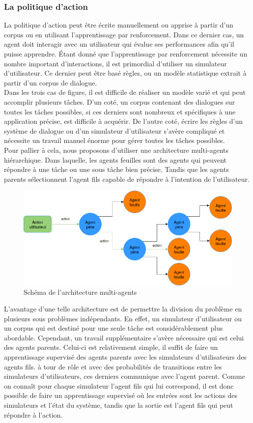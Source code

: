 \subsubsection{La politique d’action}
La politique d’action peut être écrite manuellement ou apprise à partir d’un corpus ou en utilisant l’apprentissage par renforcement. Dans ce dernier cas, un agent doit interagir avec un utilisateur qui évalue ses performances afin qu’il puisse apprendre. Étant donné que l’apprentissage par renforcement nécessite un nombre important d’interactions, il est primordial d’utiliser un simulateur d’utilisateur. Ce dernier peut être basé règles, ou un modèle statistique extrait à partir d’un corpus de dialogue.\\
Dans les trois cas de figure, il est difficile de réaliser un modèle varié et qui peut accomplir plusieurs tâches. D’un coté, un corpus contenant des dialogues sur toutes les tâches possibles, si ces derniers sont nombreux et spécifiques à une application précise, est difficile à acquérir. De l’autre coté, écrire les règles d’un système de dialogue ou d’un simulateur d’utilisateur s’avère compliqué et nécessite un travail manuel énorme pour gérer toutes les tâches possibles.\\
Pour pallier à cela, nous proposons d’utiliser une architecture multi-agents hiérarchique. Dans laquelle, les agents feuilles sont des agents qui peuvent répondre à une tâche ou une sous tâche bien précise. Tandis que les agents parents sélectionnent l’agent fils capable de répondre à l’intention de l’utilisateur.
\begin{figure}[H] 
	
	\centering
	\includegraphics[width=0.88\linewidth]{images/Conception/DM/multiagent.png}
	\caption{Schéma de l'architecture multi-agents}
\end{figure}\label{multiagent}
L’avantage d’une telle architecture est de permettre la division du problème en plusieurs sous problèmes indépendants. En effet, un simulateur d’utilisateur ou un corpus qui est destiné pour une seule tâche est considérablement plus abordable.  Cependant, un travail supplémentaire s’avère nécessaire qui est celui des agents parents. Celui-ci est relativement simple, il suffit de faire un apprentissage supervisé des agents parents avec les simulateurs d’utilisateurs des agents fils. à tour de rôle et avec des probabilités de transitions entre les simulateurs d’utilisateurs, ces derniers communique avec l’agent parent. Comme on connaît pour chaque simulateur l’agent fils qui lui correspond, il est donc possible de faire un apprentissage supervisé où les entrées sont les actions des simulateurs et l’état du système, tandis que la sortie est l’agent fils qui peut répondre à l’action.
